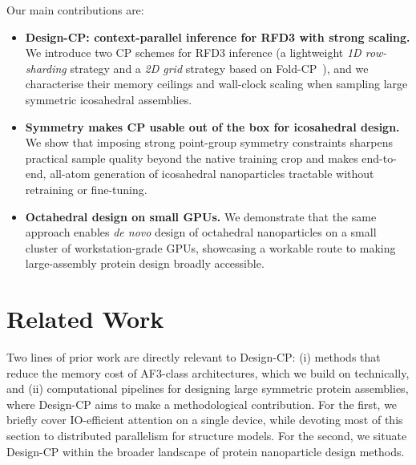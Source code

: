 \documentclass{article}
\theoremstyle{plain}
\theoremstyle{definition}
\theoremstyle{remark}
\begin{document}
Our main contributions are:
\begin{itemize}
    \item \textbf{Design-CP: context-parallel inference for RFD3 with strong scaling.} We introduce two CP schemes for RFD3 inference (a lightweight \emph{1D row-sharding} strategy and a \emph{2D grid} strategy based on Fold-CP~\cite{lin_fold-cp_2026}), and we characterise their memory ceilings and wall-clock scaling when sampling large symmetric icosahedral assemblies.
    \item \textbf{Symmetry makes CP usable out of the box for icosahedral design.} We show that imposing strong point-group symmetry constraints sharpens practical sample quality beyond the native training crop and makes end-to-end, all-atom generation of icosahedral nanoparticles tractable without retraining or fine-tuning.
    \item \textbf{Octahedral design on small GPUs.} We demonstrate that the same approach enables \emph{de novo} design of octahedral nanoparticles on a small cluster of workstation-grade GPUs, showcasing a workable route to making large-assembly protein design broadly accessible.
\end{itemize}

\section{Related Work}
\label{sec:related_work}

Two lines of prior work are directly relevant to Design-CP: (i) methods that reduce the memory cost of AF3-class architectures, which we build on technically, and (ii) computational pipelines for designing large symmetric protein assemblies, where Design-CP aims to make a methodological contribution. For the first, we briefly cover IO-efficient attention on a single device, while devoting most of this section to distributed parallelism for structure models. For the second, we situate Design-CP within the broader landscape of protein nanoparticle design methods.
\end{document}
